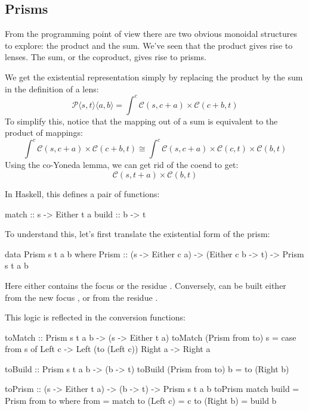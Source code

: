 \documentclass[DaoFP]{subfiles}
\begin{document}
\subsection{Prisms}

From the programming point of view there are two obvious monoidal structures to explore: the product and the sum. We've seen that the product gives rise to lenses. The sum, or the coproduct, gives rise to prisms. 

We get the existential representation simply by replacing the product by the sum in the definition of a lens:
\[ \mathcal{P}\langle s, t\rangle \langle a, b \rangle = \int^{c} \mathcal{C}(s, c + a) \times  \mathcal{C}(c + b, t) \]
To simplify this, notice that the mapping out of a sum is equivalent to the product of mappings:
\[ \int^{c} \mathcal{C}(s, c + a) \times  \mathcal{C}(c + b, t) \cong  \int^{c} \mathcal{C}(s, c + a) \times  \mathcal{C}(c, t) \times  \mathcal{C}(b, t) \]
Using the co-Yoneda lemma, we can get rid of the coend to get:
\[ \mathcal{C}(s, t + a) \times  \mathcal{C}(b, t) \]

In Haskell, this defines a pair of functions:
\begin{haskell}
match :: s -> Either t a
build :: b -> t
\end{haskell}

To understand this, let's first translate the existential form of the prism:
\begin{haskell}
data Prism s t a b where
  Prism :: (s -> Either c a) -> (Either c b -> t) -> Prism s t a b
\end{haskell}
Here  either contains the focus  or the residue . Conversely,  can be built either from the new focus , or from the residue . 

This logic is reflected in the conversion functions:
\begin{haskell}
toMatch :: Prism s t a b -> (s -> Either t a)
toMatch (Prism from to) s =
  case from s of
    Left  c -> Left (to (Left c))
    Right a -> Right a
\end{haskell}

\begin{haskell}
toBuild :: Prism s t a b -> (b -> t)
toBuild (Prism from to) b = to (Right b)
\end{haskell}

\begin{haskell}
toPrism :: (s -> Either t a) -> (b -> t) -> Prism s t a b
toPrism match build = Prism from to
  where
    from = match
    to (Left  c) = c
    to (Right b) = build b
\end{haskell}
\end{document}
